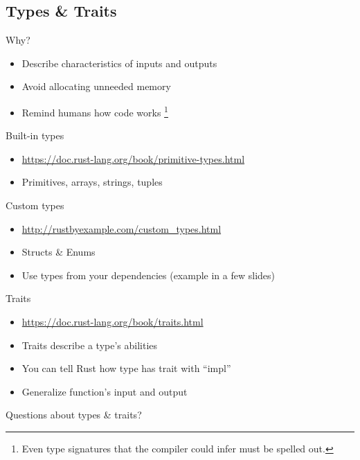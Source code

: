 \documentclass[50pt]{beamer}
\begin{document}
\subsection{Types \& Traits}

\begin{frame}
    Why?
    \begin{itemize}
        \item Describe characteristics of inputs and outputs
        \item Avoid allocating unneeded memory
        \item Remind humans how code works \footnote{Even type signatures that the compiler could infer must be spelled out.}
    \end{itemize}
\end{frame}

\begin{frame}
    Built-in types
    \begin{itemize}
        \item \url{https://doc.rust-lang.org/book/primitive-types.html}
        \item Primitives, arrays, strings, tuples
    \end{itemize}
\end{frame}

\begin{frame}
    Custom types
    \begin{itemize}
        \item \url{http://rustbyexample.com/custom_types.html}
        \item Structs \& Enums
        \item Use types from your dependencies (example in a few slides)
    \end{itemize}
\end{frame}

\begin{frame}
    Traits
    \begin{itemize}
        \item \url{https://doc.rust-lang.org/book/traits.html}
        \item Traits describe a type's abilities
        \item You can tell Rust how type has trait with ``impl''
        \item Generalize function's input and output
    \end{itemize}
\end{frame}

\begin{frame}
    Questions about types \& traits?
\end{frame}
\end{document}
